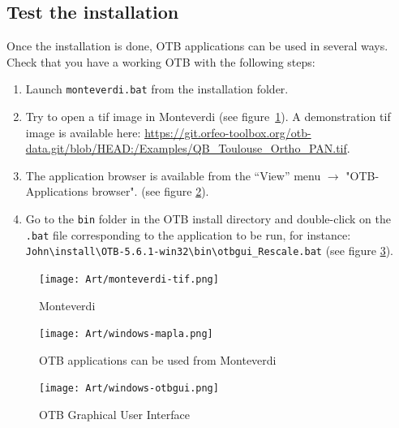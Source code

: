 \documentclass[10pt,a4paper]{article}
\begin{document}
\subsection{Test the installation}
Once the installation is done, OTB applications can be used in several ways. Check that you have a working OTB with the following steps:
\begin{enumerate}

\item Launch \texttt{monteverdi.bat} from the installation folder.

\item Try to open a tif image in Monteverdi (see
figure~\ref{fig:monteverdi}). A demonstration tif image is available here: \url{https://git.orfeo-toolbox.org/otb-data.git/blob/HEAD:/Examples/QB\_Toulouse\_Ortho\_PAN.tif}.

\item The application browser is available from the ``View'' menu 
$\rightarrow$ "OTB-Applications browser".
(see figure \ref{fig:windows-mapla}).

\item Go to the \texttt{bin} folder in the OTB install directory and double-click on the \texttt{.bat} file corresponding to the application to be run, for instance:\\
\texttt{John{\textbackslash}install{\textbackslash}OTB-5.6.1-win32{\textbackslash}bin{\textbackslash}otbgui\_Rescale.bat}
(see figure \ref{fig:windows-otbgui}).

\end{enumerate}

\begin{figure}[h]
  \center
  \texttt{[image: Art/monteverdi-tif.png]}
  \caption[]{Monteverdi}
  \label{fig:monteverdi}
\end{figure}

\begin{figure}[h]
  \center
  \texttt{[image: Art/windows-mapla.png]}
  \caption[]{OTB applications can be used from Monteverdi}
  \label{fig:windows-mapla}
\end{figure}

\begin{figure}[h]
  \center
  \texttt{[image: Art/windows-otbgui.png]}
  \caption[]{OTB Graphical User Interface}
  \label{fig:windows-otbgui}
\end{figure}
\end{document}
